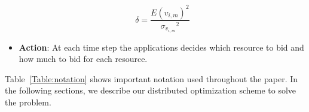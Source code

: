 \begin{itemize}
\begin{equation}
\delta =  \frac{E(v_{i,m})^2}{{\sigma_{v_{i,m}}}^2}
\end{equation}  
  \item \textbf{Action}: At each time step the applications decides which resource to bid and how much to bid for each resource. 
\end{itemize} 
\indent Table~\ref{Table:notation} shows important notation used throughout the paper. In the following sections, we describe our distributed optimization scheme to solve the problem. 
